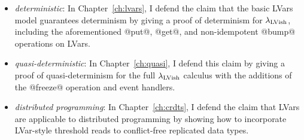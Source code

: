 \begin{itemize}
  \item \emph{deterministic}: In Chapter~\ref{ch:lvars}, I defend the claim that the basic
    LVars model guarantees determinism by giving a proof of
    determinism for $\lambda_{\textrm{LVish}}$, including the aforementioned
    @put@, @get@, and non-idempotent @bump@ operations on LVars.

  \item \emph{quasi-deterministic}: In Chapter~\ref{ch:quasi}, I defend this claim by giving
    a proof of quasi-determinism for the full $\lambda_{\textrm{LVish}}$ calculus
    with the additions of the @freeze@ operation and event handlers.

  \item \emph{distributed programming}: In Chapter~\ref{ch:crdts}, I defend the claim that
    LVars are applicable to distributed programming by showing how to incorporate
    LVar-style threshold reads to conflict-free replicated data types. 
\end{itemize}
